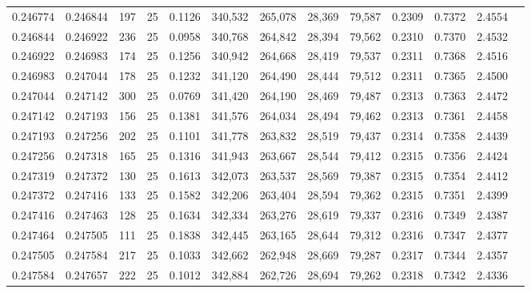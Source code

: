 \begin{tabular}{rrrrrrrrrrrrr}
0.246774 & 0.246844 &   197 &  25 &                                     0.1126 & 340,532 & 265,078 &  28,369 &  79,587 & 0.2309 & 0.7372 & 2.4554 \\
0.246844 & 0.246922 &   236 &  25 &                                     0.0958 & 340,768 & 264,842 &  28,394 &  79,562 & 0.2310 & 0.7370 & 2.4532 \\
0.246922 & 0.246983 &   174 &  25 &                                     0.1256 & 340,942 & 264,668 &  28,419 &  79,537 & 0.2311 & 0.7368 & 2.4516 \\
0.246983 & 0.247044 &   178 &  25 &                                     0.1232 & 341,120 & 264,490 &  28,444 &  79,512 & 0.2311 & 0.7365 & 2.4500 \\
0.247044 & 0.247142 &   300 &  25 &                                     0.0769 & 341,420 & 264,190 &  28,469 &  79,487 & 0.2313 & 0.7363 & 2.4472 \\
0.247142 & 0.247193 &   156 &  25 &                                     0.1381 & 341,576 & 264,034 &  28,494 &  79,462 & 0.2313 & 0.7361 & 2.4458 \\
0.247193 & 0.247256 &   202 &  25 &                                     0.1101 & 341,778 & 263,832 &  28,519 &  79,437 & 0.2314 & 0.7358 & 2.4439 \\
0.247256 & 0.247318 &   165 &  25 &                                     0.1316 & 341,943 & 263,667 &  28,544 &  79,412 & 0.2315 & 0.7356 & 2.4424 \\
0.247319 & 0.247372 &   130 &  25 &                                     0.1613 & 342,073 & 263,537 &  28,569 &  79,387 & 0.2315 & 0.7354 & 2.4412 \\
0.247372 & 0.247416 &   133 &  25 &                                     0.1582 & 342,206 & 263,404 &  28,594 &  79,362 & 0.2315 & 0.7351 & 2.4399 \\
0.247416 & 0.247463 &   128 &  25 &                                     0.1634 & 342,334 & 263,276 &  28,619 &  79,337 & 0.2316 & 0.7349 & 2.4387 \\
0.247464 & 0.247505 &   111 &  25 &                                     0.1838 & 342,445 & 263,165 &  28,644 &  79,312 & 0.2316 & 0.7347 & 2.4377 \\
0.247505 & 0.247584 &   217 &  25 &                                     0.1033 & 342,662 & 262,948 &  28,669 &  79,287 & 0.2317 & 0.7344 & 2.4357 \\
0.247584 & 0.247657 &   222 &  25 &                                     0.1012 & 342,884 & 262,726 &  28,694 &  79,262 & 0.2318 & 0.7342 & 2.4336 \\

\end{tabular}
